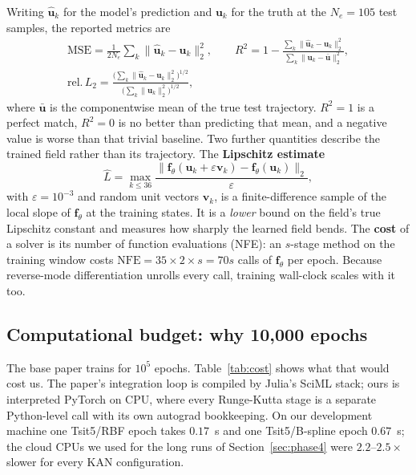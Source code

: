 Writing $\hat{\mathbf{u}}_k$ for the model's prediction and $\mathbf{u}_k$
for the truth at the $N_e=105$ test samples, the reported metrics are
\begin{gather}
\mathrm{MSE}=\frac{1}{2N_e}\sum_{k}\|\hat{\mathbf{u}}_k-\mathbf{u}_k\|_2^2,\qquad
R^2 = 1-\frac{\sum_k\|\hat{\mathbf{u}}_k-\mathbf{u}_k\|_2^2}{\sum_k\|\mathbf{u}_k-\bar{\mathbf{u}}\|_2^2},
\nonumber\\
\text{rel.}\,L_2=\frac{\big(\sum_k\|\hat{\mathbf{u}}_k-\mathbf{u}_k\|_2^2\big)^{1/2}}{\big(\sum_k\|\mathbf{u}_k\|_2^2\big)^{1/2}},
\label{eq:metrics}
\end{gather}
where $\bar{\mathbf{u}}$ is the componentwise mean of the true test
trajectory. $R^2=1$ is a perfect match, $R^2=0$ is no better than
predicting that mean, and a negative value is worse than that trivial
baseline. Two further quantities describe the trained field rather than its
trajectory. The \textbf{Lipschitz estimate}
\begin{equation}
\hat L=\max_{k\le 36}\frac{\|\mathbf{f}_\theta(\mathbf{u}_k+\varepsilon\mathbf{v}_k)-\mathbf{f}_\theta(\mathbf{u}_k)\|_2}{\varepsilon},
\label{eq:lipschitz}
\end{equation}
with $\varepsilon=10^{-3}$ and random unit vectors $\mathbf{v}_k$, is a
finite-difference sample of the local slope of $\mathbf{f}_\theta$ at the
training states. It is a \emph{lower} bound on the field's true Lipschitz
constant and measures how sharply the learned field bends. The
\textbf{cost} of a solver is its number of function evaluations (NFE): an
$s$-stage method on the training window costs $\text{NFE}=35\times2\times
s=70s$ calls of $\mathbf{f}_\theta$ per epoch. Because reverse-mode
differentiation unrolls every call, training wall-clock scales with it too.

\subsection{Computational budget: why 10{,}000 epochs}
\label{sec:budget}

The base paper trains for $10^5$ epochs. Table~\ref{tab:cost} shows what
that would cost us. The paper's integration loop is compiled by Julia's
SciML stack; ours is interpreted PyTorch on CPU, where every Runge-Kutta
stage is a separate Python-level call with its own autograd bookkeeping. On
our development machine one Tsit5/RBF epoch takes $0.17$~s and one
Tsit5/B-spline epoch $0.67$~s; the cloud CPUs we used for the long runs of
Section~\ref{sec:phase4} were $2.2$--$2.5\times$ slower for every KAN
configuration.

